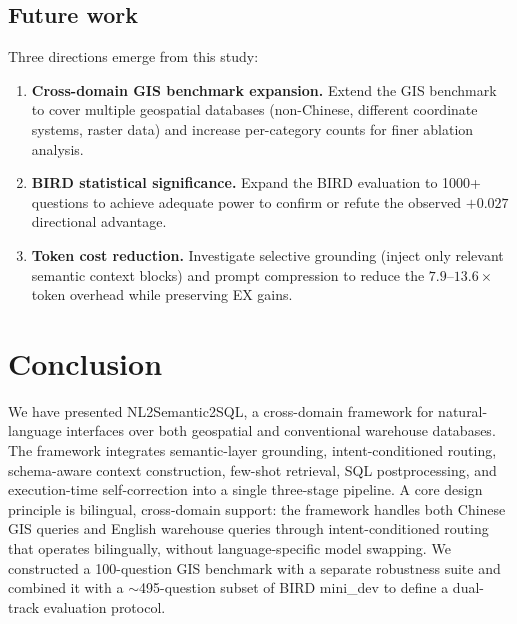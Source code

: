\documentclass[11pt]{article}
\begin{document}
\subsection{Future work}

Three directions emerge from this study:
\begin{enumerate}[leftmargin=*]
  \item \textbf{Cross-domain GIS benchmark expansion.} Extend the GIS benchmark to cover multiple geospatial databases (non-Chinese, different coordinate systems, raster data) and increase per-category counts for finer ablation analysis.
  \item \textbf{BIRD statistical significance.} Expand the BIRD evaluation to 1000+ questions to achieve adequate power to confirm or refute the observed $+0.027$ directional advantage.
  \item \textbf{Token cost reduction.} Investigate selective grounding (inject only relevant semantic context blocks) and prompt compression to reduce the $7.9$--$13.6\times$ token overhead while preserving EX gains.
\end{enumerate}

\section{Conclusion}
\label{sec:conclusion}

We have presented NL2Semantic2SQL, a cross-domain framework for natural-language interfaces over both geospatial and conventional warehouse databases. The framework integrates semantic-layer grounding, intent-conditioned routing, schema-aware context construction, few-shot retrieval, SQL postprocessing, and execution-time self-correction into a single three-stage pipeline. A core design principle is bilingual, cross-domain support: the framework handles both Chinese GIS queries and English warehouse queries through intent-conditioned routing that operates bilingually, without language-specific model swapping. We constructed a 100-question GIS benchmark with a separate robustness suite and combined it with a $\sim$495-question subset of BIRD mini\_dev to define a dual-track evaluation protocol.
\end{document}
